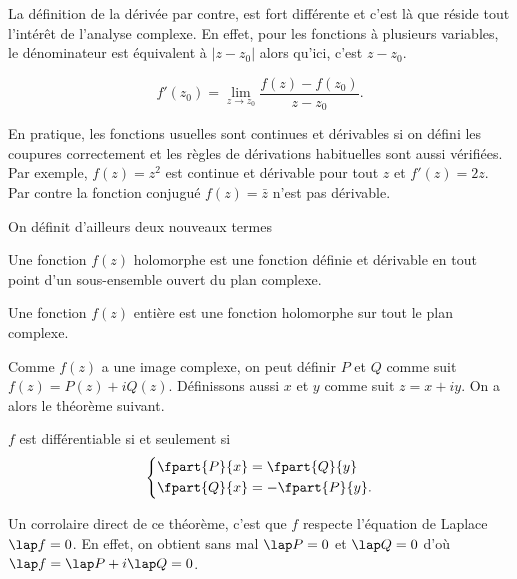 La définition de la dérivée par contre, est fort différente
et c'est là que réside tout l'intérêt de l'analyse complexe.
En effet, pour les fonctions à plusieurs variables, le dénominateur est
équivalent à $|z - z_0|$ alors qu'ici, c'est $z - z_0$.
\begin{mydef}
  \[ f'(z_0) = \lim_{z \to z_0} \frac{f(z) - f(z_0)}{z - z_0}. \]
\end{mydef}

En pratique, les fonctions usuelles sont continues et dérivables si
on défini les coupures correctement et les règles de dérivations
habituelles sont aussi vérifiées.
Par exemple, $f(z) = z^2$ est continue et dérivable pour tout $z$ et
$f'(z) = 2z$.
Par contre la fonction conjugué $f(z) = \bar{z}$ n'est pas dérivable.

On définit d'ailleurs deux nouveaux termes
\begin{mydef}
  Une fonction $f(z)$ holomorphe est une fonction définie et dérivable
  en tout point d'un sous-ensemble ouvert du plan complexe.
\end{mydef}
\begin{mydef}
  Une fonction $f(z)$ entière est une fonction holomorphe sur tout
  le plan complexe.
\end{mydef}

Comme $f(z)$ a une image complexe,
on peut définir $P$ et $Q$ comme suit $f(z) = P(z) + iQ(z)$.
Définissons aussi $x$ et $y$ comme suit $z = x + iy$.
On a alors le théorème suivant.
\begin{mytheo}
  $f$ est différentiable si et seulement si
  \[ \left\{\begin{aligned}
      \fpart{P}{x} & = \fpart{Q}{y}\\
      \fpart{Q}{x} & = -\fpart{P}{y}.
  \end{aligned}\right. \]
\end{mytheo}

Un corrolaire direct de ce théorème, c'est que $f$ respecte l'équation
de Laplace $\lap f = 0$.
En effet, on obtient sans mal $\lap P = 0$ et $\lap Q = 0$ d'où
$\lap f = \lap P + i\lap Q = 0$.

